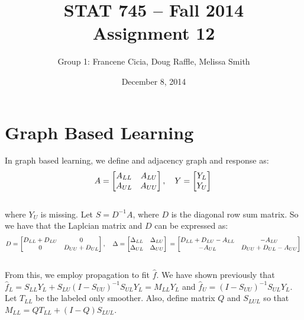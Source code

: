 \documentclass[a4paper]{article}
\title{\vspace{-30pt}STAT 745 -- Fall 2014\\Assignment 12}
\author{Group 1: Francene Cicia, Doug Raffle, Melissa Smith}
\date{December 8, 2014}
\begin{document}
\setlength{\parindent}{0pt}
\vspace{-50pt}
\maketitle
\renewcommand{\thesection}{\alph{section}.}

\section{Graph Based Learning}
In graph based learning, we define and adjacency graph and response as:\\
$$
A = 
\begin{bmatrix}
     A_{LL} & A_{LU} \\
     A_{UL} & A_{UU} 
\end{bmatrix},
\quad
Y=
\begin{bmatrix}
     Y_{L} \\
     Y_{U}
\end{bmatrix}\\
$$\\

where $Y_{U}$ is missing. Let $S=D^{-1}A$, where $D$ is the diagonal
row sum matrix. So we have that the Laplcian matrix and $D$ can be
expressed as:\\ 

$$
D = 
\begin{bmatrix}
     D_{LL} + D_{LU} & 0 \\
     0 & D_{UU} + D_{UL}
\end{bmatrix},
\quad
\Delta=
\begin{bmatrix}
     \Delta_{LL} & \Delta_{LU} \\
     \Delta_{UL} & \Delta_{UU} 
\end{bmatrix}\\
=
\begin{bmatrix}
     D_{LL} + D_{LU} - A_{LL} & -A_{LU} \\
     -A_{UL} & D_{UU} + D_{UL} - A_{UU}
\end{bmatrix}\\
$$\\

From this, we employ propagation to fit $\hat{f}$. We have shown previously that
$\hat{f}_{L}= S_{LL}Y_{L} + S_{LU}(I - S_{UU})^{-1}S_{UL}Y_{L} =
M_{LL}Y_{L}$ and $\hat{f}_{U} = (I - S_{UU})^{-1}S_{UL}Y_{L}$. Let
$T_{LL}$ be the labeled only smoother. Also, define matrix $Q$ and
$S_{LUL}$ so that $M_{LL} = QT_{LL} + (I - Q)S_{LUL}$.  
\end{document}
